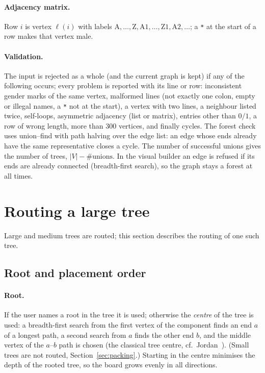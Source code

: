 \documentclass[11pt,a4paper]{article}
\theoremstyle{remark}
\begin{document}
\paragraph{Adjacency matrix.} Row $i$ is vertex $\ell(i)$ with labels $\mathrm{A},\dots,\mathrm{Z},\mathrm{A1},
\dots,\mathrm{Z1},\mathrm{A2},\dots$; a \texttt{*} at the start of a row makes that vertex male.

\paragraph{Validation.} The input is rejected as a whole (and the current graph is kept) if any of the following
occurs; every problem is reported with its line or row:
inconsistent gender marks of the same vertex, malformed lines (not exactly one colon, empty or illegal names, a
\texttt{*} not at the start), a vertex with two lines, a neighbour listed twice, self-loops, asymmetric adjacency
(list or matrix), entries other than $0/1$, a row of wrong length, more than $300$ vertices, and finally cycles. The
forest check uses union--find with path halving over the edge list: an edge whose ends already have the same
representative closes a cycle. The number of successful unions gives the number of trees,
$|V|-\#\text{unions}$. In the visual builder an edge is refused if its ends are already connected (breadth-first
search), so the graph stays a forest at all times.

\section{Routing a large tree}\label{sec:routing}

Large and medium trees are routed; this section describes the routing of one such tree.

\subsection{Root and placement order}\label{sec:root}

\paragraph{Root.} If the user names a root in the tree it is used; otherwise the \emph{centre} of the tree is used:
a breadth-first search from the first vertex of the component finds an end $a$ of a longest path, a second search
from $a$ finds the other end $b$, and the middle vertex of the $a$--$b$ path is chosen (the classical tree centre,
cf.\ Jordan~\cite{jordan1869}). (Small trees are not routed, Section~\ref{sec:packing}.) Starting in the centre
minimises the depth of the rooted tree, so the board grows evenly in all directions.
\end{document}
